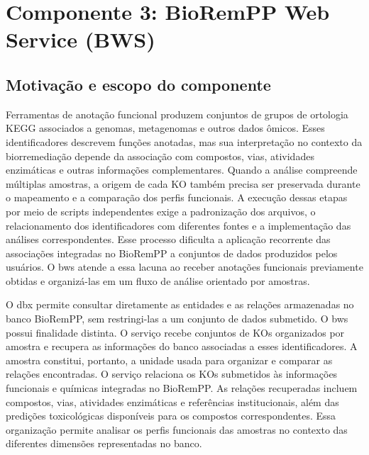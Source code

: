 \chapter{Componente 3: BioRemPP Web Service (BWS)}
\label{cap:comp3}

\section{Motivação e escopo do componente}
\label{sec:c3-motivacao}

Ferramentas de anotação funcional produzem conjuntos de grupos de ortologia
KEGG associados a genomas, metagenomas e outros dados ômicos. Esses
identificadores descrevem funções anotadas, mas sua interpretação no contexto
da biorremediação depende da associação com compostos, vias, atividades
enzimáticas e outras informações complementares. Quando a análise compreende
múltiplas amostras, a origem de cada KO também precisa ser preservada durante
o mapeamento e a comparação dos perfis funcionais. A execução dessas etapas por meio de scripts independentes exige a
padronização dos arquivos, o relacionamento dos identificadores com diferentes
fontes e a implementação das análises correspondentes. Esse processo dificulta
a aplicação recorrente das associações integradas no BioRemPP a conjuntos de
dados produzidos pelos usuários. O \gls{bws} atende a essa lacuna ao receber
anotações funcionais previamente obtidas e organizá-las em um fluxo de análise
orientado por amostras.

O \gls{dbx} permite consultar diretamente as entidades e as relações
armazenadas no banco BioRemPP, sem restringi-las a um conjunto de dados
submetido. O \gls{bws} possui finalidade distinta. O serviço recebe conjuntos
de KOs organizados por amostra e recupera as informações do banco associadas
a esses identificadores. A amostra constitui, portanto, a unidade usada para
organizar e comparar as relações encontradas. O serviço relaciona os KOs submetidos às informações funcionais e químicas
integradas no BioRemPP. As relações recuperadas incluem compostos, vias,
atividades enzimáticas e referências institucionais, além das predições
toxicológicas disponíveis para os compostos correspondentes. Essa organização
permite analisar os perfis funcionais das amostras no contexto das diferentes
dimensões representadas no banco.

